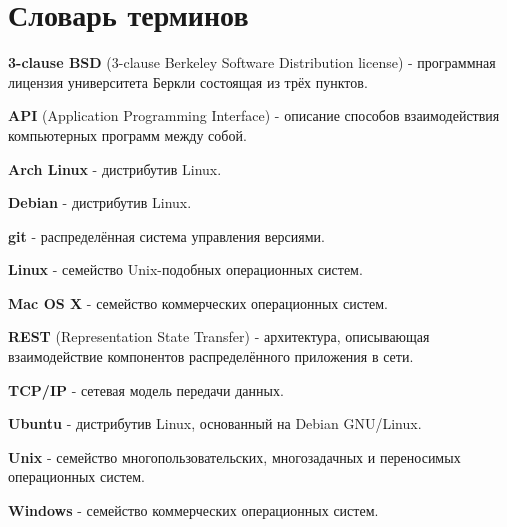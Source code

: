 \chapter*{\centering Словарь терминов}


\textbf{3-­clause BSD} (3-­clause Berkeley Software Distribution license) - программная лицензия университета Беркли состоящая из трёх пунктов.

\textbf{API} (Application Programming Interface) - описание способов взаимодействия компьютерных программ между собой.

\textbf{Arch Linux} - дистрибутив Linux.

\textbf{Debian} - дистрибутив Linux.

\textbf{git} - распределённая система управления версиями.

\textbf{Linux} - семейство Unix-подобных операционных систем.

\textbf{Mac OS X} - семейство коммерческих операционных систем.

\textbf{REST} (Representation State Transfer) - архитектура, описывающая взаимодействие компонентов распределённого приложения в сети.

\textbf{TCP/IP} - сетевая модель передачи данных.

\textbf{Ubuntu} - дистрибутив Linux, основанный на Debian GNU/Linux.

\textbf{Unix} - семейство многопользовательских, многозадачных и переносимых операционных систем.

\textbf{Windows} - семейство коммерческих операционных систем.


